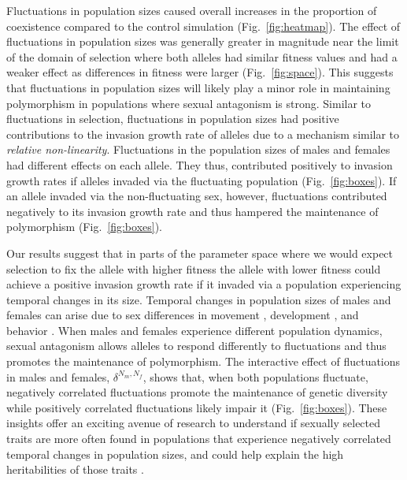 \documentclass[12pt]{article}
\begin{document}
 Fluctuations in population sizes caused overall increases in the proportion of coexistence compared to the control simulation  (Fig.~\ref{fig:heatmap}).  The effect of fluctuations in population sizes was generally greater in magnitude near the limit of the domain of selection where both alleles had similar fitness values and had a weaker effect as differences in fitness were larger (Fig.~\ref{fig:space}). This suggests that fluctuations in population sizes will likely play a minor role in maintaining polymorphism in populations where sexual antagonism is strong.  Similar to fluctuations in selection, fluctuations in population sizes had positive contributions to the invasion growth rate of alleles due to a mechanism similar to \textit{relative non-linearity}. Fluctuations in the population sizes of males and females had different effects on each allele. They thus, contributed positively to invasion growth rates if alleles invaded via the fluctuating population (Fig.~\ref{fig:boxes}). If an allele invaded via the non-fluctuating sex, however, fluctuations contributed negatively to its invasion growth rate and thus hampered the maintenance of polymorphism (Fig.~\ref{fig:boxes}).

 Our results suggest that in parts of the parameter space where we would expect selection to fix the allele with higher fitness the allele with lower fitness could achieve a positive invasion growth rate if it invaded via a population experiencing temporal changes in its size.  Temporal changes in population sizes of males and females can arise due to sex differences in movement \citep[e.g., if males immigrate to higher quality areas;][]{matter2002experimental}, development \citep[e.g., females requiring more time to mature than males;][]{kasumovic2008spatial}, and behavior \citep[e.g., cannibalistic mating;][]{elgar2003male}. When males and females experience different population dynamics, sexual antagonism allows alleles to respond differently to fluctuations and thus promotes the maintenance of polymorphism. The interactive effect of fluctuations in males and females, $\delta^{N_{m},N_{f}}$, shows that, when both populations fluctuate, negatively correlated fluctuations promote the maintenance of genetic diversity while positively correlated fluctuations likely impair it  (Fig.~\ref{fig:boxes}). These insights offer an exciting avenue of research to understand if sexually selected traits are more often found in populations that experience negatively correlated temporal changes in population sizes, and could help explain the high heritabilities of those traits \citep{reinhold2000maintenance}.
\end{document}
